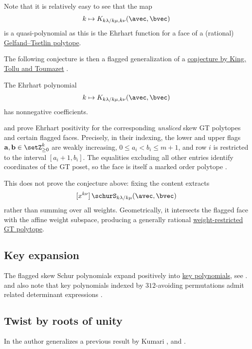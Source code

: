 Note that it is relatively easy to see that the map 
\[
 k \mapsto K_{k\lambda/k\mu,k\nu}(\avec,\bvec)
\]
is a quasi-polynomial as this is the Ehrhart function for 
a face of a (rational) \hyperref[gtKostka]{Gelfand--Tsetlin polytope}.

The following conjecture is then a flagged generalization of 
a \hyperref[gtKostkaEhrhart]{conjecture by King, Tollu and Toumazet}
\cite{KingTolluToumazet2004}.
\begin{conjecture}
\label{flaggedSchurKostkaConjecture}
The Ehrhart polynomial
\[
 k \mapsto K_{k\lambda/k\mu,k\nu}(\avec,\bvec)
\]
has nonnegative coefficients.
\end{conjecture}

 and  prove Ehrhart positivity
for the corresponding \emph{unsliced} skew GT polytopes and certain flagged
faces.  Precisely, in their indexing, the lower and upper flags
$\mathbf a,\mathbf b\in\setZ_{\geq0}^k$ are weakly increasing,
$0\leq a_i<b_i\leq m+1$, and row $i$ is restricted to the interval
$[a_i+1,b_i]$.  The equalities excluding all other entries identify
coordinates of the GT poset, so the face is itself a marked order polytope
\cite[Thm.~3.5 and Sec.~3.2]{JochemkoMenon2026x}.

This does not prove the conjecture above: fixing the content extracts
\[
 [x^{k\nu}]\,\schurS_{k\lambda/k\mu}(\avec,\bvec)
\]
rather than summing over all weights.  Geometrically, it intersects the
flagged face with the affine weight subspace, producing a generally rational
\hyperref[weightRestrictedGTPolytope]{weight-restricted GT polytope}.




\subsection[flaggedSchurKeyExpansion]{Key expansion}


The flagged skew Schur polynomials expand positively into \hyperref[key]{key polynomials},
see \cite{ReinerShimozono1995}.
 and  also note that key
polynomials indexed by $312$-avoiding permutations admit related determinant
expressions \cite{ProctorWillis2021}.



\subsection[flaggedSchurRootsOfUnity]{Twist by roots of unity}

In \cite{Kumar2023x} the author generalizes a previous result by Kumari \cite{Kumari2022x},
and \cite[Thm.~16]{LeeOh2022}.
